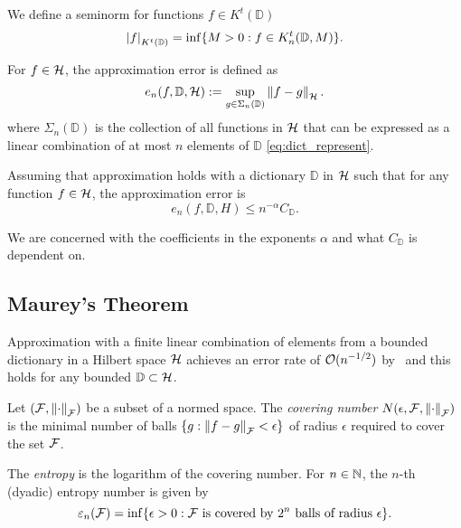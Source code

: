 We define a seminorm for functions $f \in K^t(\mathbb{D})$
\begin{equation}
    \label{eq:general_seminorm}
    \left| f \right|_{K^t(\mathbb{D})} = \inf \{
        M >0: f \in K^t_n(\mathbb{D}, M)
    \}.
\end{equation}


For $f \in \mathcal{H}$, the approximation error is defined as
\begin{equation}
    \label{eq:appro_err_hilbert}
    e_n(f, \mathbb{D}, \mathcal{H})
        := \sup_{g\in\Sigma_n(\mathbb{D})} \left\| f - g \right\|_{\mathcal{H}}.
\end{equation}
where $\Sigma_n(\mathbb{D})$ is the collection of all functions in $\mathcal{H}$
that can be expressed as a linear combination of at most $n$ elements of
$\mathbb{D}$ \eqref{eq:dict_represent}.

Assuming that approximation holds with a dictionary $\mathbb{D}$ in $\mathcal{H}$
such that for any function $f \in \mathcal{H}$, the approximation error is
\begin{equation}
    \label{eq:appro_error_general}
    e_n(f, \mathbb{D}, H) \leq n^{-\alpha} C_{\mathbb{D}}.
\end{equation}

We are concerned with the coefficients in the exponents $\alpha$ and what
$C_{\mathbb{D}}$ is dependent on.

\subsection{Maurey's Theorem}
\label{subsec:maurey}

Approximation with a finite linear combination of elements from a bounded
dictionary in a Hilbert space $\mathcal{H}$ achieves an error rate of
$\mathcal{O}(n^{-1/2})$ by~\cite{pisierRemarquesResultatNon1980} and this holds for
any bounded $\mathbb{D} \subset \mathcal{H}$.

\begin{definition}
    \label{def:covering_num}
    Let $(\mathcal{F}, \left\| \cdot \right\|_{\mathcal{F}})$ be a subset of a normed space. The
    \textit{covering number} $N(\epsilon, \mathcal{F}, \left\| \cdot \right\|_{\mathcal{F}})$ is
    the minimal number of balls $\{g: \left\| f - g \right\|_{\mathcal{F}} < \epsilon\}$ of
    radius $\epsilon$ required to cover the set $\mathcal{F}$. 
\end{definition}

\begin{definition}
    \label{def:entropy} The \textit{entropy} is the logarithm of the covering
    number. For $n \in \mathbb{N}$, the $n$-th (dyadic) entropy number is given by
    \begin{equation}
        \varepsilon_{n}({\mathcal{F}})
        = \inf \{
            \epsilon > 0: \mathcal{F} \text{ is covered by } 2^n 
            \text{ balls of radius } \epsilon
        \}.
    \end{equation}
\end{definition}



